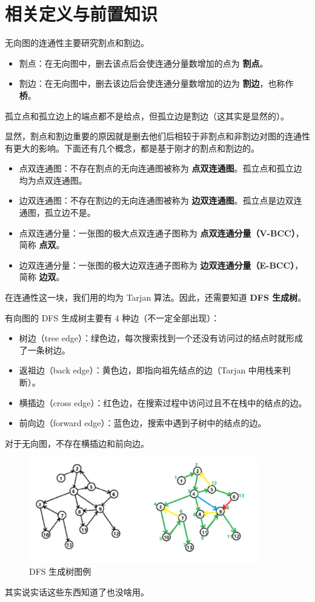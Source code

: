 \documentclass[11pt,oneside,a4paper,UTF8]{book}
\begin{document}
	\section{相关定义与前置知识}
	无向图的连通性主要研究割点和割边。
	\begin{itemize}
		\item 割点：在无向图中，删去该点后会使连通分量数增加的点为 \textbf{割点}。
		\item 割边：在无向图中，删去该边后会使连通分量数增加的边为 \textbf{割边}，也称作 \textbf{桥}。
	\end{itemize}
	\noindent
	孤立点和孤立边上的端点都不是给点，但孤立边是割边（这其实是显然的）。\par
	显然，割点和割边重要的原因就是删去他们后相较于非割点和非割边对图的连通性有更大的影响。下面还有几个概念，都是基于刚才的割点和割边的。\par
	\begin{itemize}
		\item 点双连通图：不存在割点的无向连通图被称为 \textbf{点双连通图}。孤立点和孤立边均为点双连通图。
		\item 边双连通图：不存在割边的无向连通图被称为 \textbf{边双连通图}。孤立点是边双连通图，孤立边不是。
		\item 点双连通分量：一张图的极大点双连通子图称为 \textbf{点双连通分量（V-BCC）}，简称 \textbf{点双}。
		\item 边双连通分量：一张图的极大边双连通子图称为 \textbf{边双连通分量（E-BCC）}，简称 \textbf{边双}。
	\end{itemize}
	
	在连通性这一块，我们用的均为 Tarjan 算法。因此，还需要知道 \textbf{DFS 生成树}。\par
	有向图的 DFS 生成树主要有 4 种边（不一定全部出现）：
	\begin{itemize}
		\item 树边（tree edge）：绿色边，每次搜索找到一个还没有访问过的结点时就形成了一条树边。
		\item 返祖边（back edge）：黄色边，即指向祖先结点的边（Tarjan 中用栈来判断）。
		\item 横插边（cross edge）：红色边，在搜索过程中访问过且不在栈中的结点的边。
		\item 前向边（forward edge）：蓝色边，搜索中遇到子树中的结点的边。
	\end{itemize}
	对于无向图，不存在横插边和前向边。
	\begin{figure}[H]
		\centering
		\includegraphics[width=10cm]{picture/图论/连通性相关/1.png}
		\caption{DFS 生成树图例}
	\end{figure}
	其实说实话这些东西知道了也没啥用。
	
\end{document}
